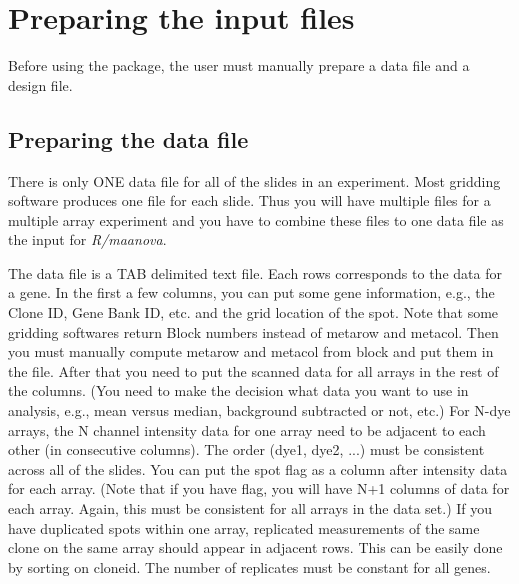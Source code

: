 \newpage
\section{Preparing the input files}
Before using the package, the user must manually prepare
a data file and a design file.

\subsection{Preparing the data file}
There is only ONE data file for all of the slides in
an experiment. Most gridding software produces
one file for each slide. Thus you will
have multiple files for a multiple array experiment and you
have to combine these files to one data file as the input 
for {\em R/maanova}. 

The data file is a TAB delimited text file. Each rows corresponds
to the data for a gene. 
In the first a few columns, you can put some gene information,
e.g., the Clone ID, Gene Bank ID, etc. and the grid location of the spot.
Note that some gridding softwares return Block numbers instead of
metarow and metacol. Then you must manually compute metarow 
and metacol from block and put them in the file.
After that you need to put the scanned data for all arrays in the rest 
of the columns.
(You need to make the decision what data you want to
use in analysis, e.g., mean versus median, background subtracted 
or not, etc.) 
For N-dye arrays, the N channel intensity data for one array
need to be adjacent to each other (in consecutive columns). 
The order (dye1, dye2, ...) must be consistent across all of the slides.
You can put the spot flag as a column after intensity data
for each array. (Note that if you have flag, you will have N+1
columns of data for each array. Again, this must be consistent
for all arrays in the data set.) If you have duplicated spots 
within one array, replicated
measurements of the same clone on the same array should appear in
adjacent rows. This can be easily done by sorting on cloneid. 
The number of replicates must be constant for all genes.

